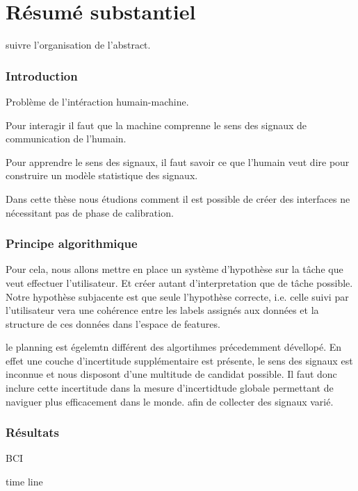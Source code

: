 
\chapter*{Résumé substantiel}
\label{chapter:frecnhresume}
\minitoc

suivre l'organisation de l'abstract.

\subsection*{Introduction}

Problème de l'intéraction humain-machine.

Pour interagir il faut que la machine comprenne le sens des signaux de communication de l'humain.

Pour apprendre le sens des signaux,  il faut savoir ce que l'humain veut dire pour construire un modèle statistique des signaux.

Dans cette thèse nous étudions comment il est possible de créer des interfaces ne nécessitant pas de phase de calibration.


\subsection*{Principe algorithmique}

Pour cela, nous allons mettre en place un système d'hypothèse sur la tâche que veut effectuer l'utilisateur. Et créer autant d'interpretation que de tâche possible. Notre hypothèse subjacente est que seule l'hypothèse correcte, i.e. celle suivi par l'utilisateur vera une cohérence entre les labels assignés aux données et la structure de ces données dans l'espace de features.

le planning est égelemtn différent des algortihmes précedemment dévellopé. En effet une couche d'incertitude supplémentaire est présente, le sens des signaux est inconnue et nous disposont d'une multitude de candidat possible. Il faut donc inclure cette incertitude dans la mesure d'incertidtude globale permettant de naviguer plus efficacement dans le monde. afin de collecter des signaux varié. 

\subsection*{Résultats}

BCI

time line

